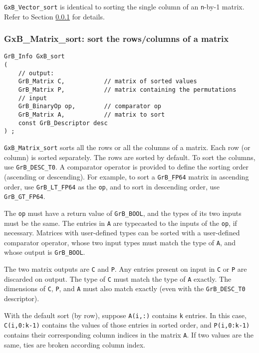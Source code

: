 \documentclass[12pt]{article}
\begin{document}
\verb'GxB_Vector_sort' is identical to sorting the single column of an
\verb'n'-by-1 matrix.
Refer to Section \ref{matrix_sort} for details.

\subsubsection{{\sf GxB\_Matrix\_sort:} sort the rows/columns of a matrix}
\label{matrix_sort}

\begin{mdframed}[userdefinedwidth=6in]
{\footnotesize
\begin{verbatim}
GrB_Info GxB_sort
(
    // output:
    GrB_Matrix C,           // matrix of sorted values
    GrB_Matrix P,           // matrix containing the permutations
    // input
    GrB_BinaryOp op,        // comparator op
    GrB_Matrix A,           // matrix to sort
    const GrB_Descriptor desc
) ;
\end{verbatim}
} \end{mdframed}

\verb'GxB_Matrix_sort' sorts all the rows or all the columns of a matrix.
Each row (or column) is sorted separately.  The rows are sorted by default.
To sort the columns, use \verb'GrB_DESC_T0'.  A comparator operator is
provided to define the sorting order (ascending or descending).
For example, to sort a \verb'GrB_FP64' matrix in ascending order,
use \verb'GrB_LT_FP64' as the \verb'op', and to sort in descending order,
use \verb'GrB_GT_FP64'.

The \verb'op' must have a return value of \verb'GrB_BOOL', and the types of
its two inputs must be the same.  The entries in \verb'A' are typecasted to
the inputs of the \verb'op', if necessary.  Matrices with user-defined types
can be sorted with a user-defined comparator operator, whose two input types
must match the type of \verb'A', and whose output is \verb'GrB_BOOL'.

The two matrix outputs are \verb'C' and \verb'P'.  Any entries present on input
in \verb'C' or \verb'P' are discarded on output.  The type of \verb'C' must
match the type of \verb'A' exactly.  The dimensions of \verb'C', \verb'P', and
\verb'A' must also match exactly (even with the \verb'GrB_DESC_T0'
descriptor).

With the default sort (by row), suppose \verb'A(i,:)' contains \verb'k'
entries.  In this case, \verb'C(i,0:k-1)' contains the values of those entries
in sorted order, and \verb'P(i,0:k-1)' contains their corresponding column
indices in the matrix \verb'A'.  If two values are the same, ties are broken
according column index.
\end{document}
